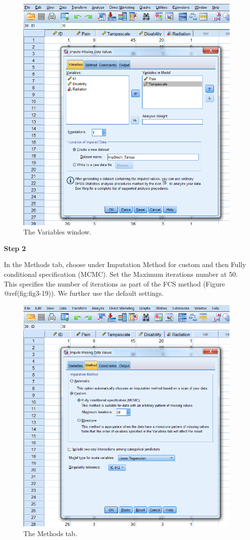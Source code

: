 \documentclass[
]{book}
\begin{document}
\begin{figure}

{\centering \includegraphics[width=0.7\linewidth]{images/fig3.18} 

}

\caption{The Variables window.}\label{fig:fig3-18}
\end{figure}

\textbf{Step 2}

In the Methods tab, choose under Imputation Method for custom and then
Fully conditional specification (MCMC). Set the Maximum iterations
number at 50. This specifies the number of iterations as part of the FCS
method (Figure @ref(fig:fig3-19)). We further use the default settings.

\begin{figure}

{\centering \includegraphics[width=0.7\linewidth]{images/fig3.19} 

}

\caption{The Methods tab.}\label{fig:fig3-19}
\end{figure}
\end{document}
